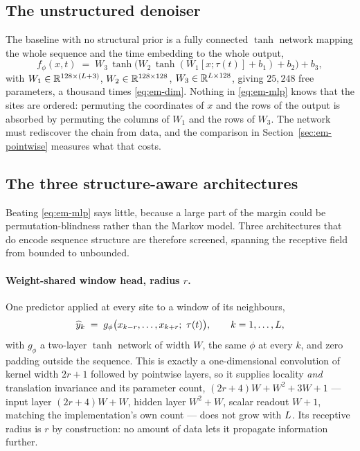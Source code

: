 \subsection{The unstructured denoiser}

The baseline with no structural prior is a fully connected $\tanh$ network
mapping the whole sequence and the time embedding to the whole output,
\begin{equation}
  f_\phi(x,t) \;=\; W_3\,\tanh\!\big(W_2\,\tanh(W_1 [x;\tau(t)] + b_1) + b_2\big) + b_3,
  \label{eq:em-mlp}
\end{equation}
with $W_1 \in \mathbb{R}^{128\times(L+3)}$, $W_2 \in \mathbb{R}^{128\times128}$,
$W_3 \in \mathbb{R}^{L\times128}$, giving $25{,}248$ free parameters, a thousand
times \eqref{eq:em-dim}. Nothing in \eqref{eq:em-mlp} knows that the sites are
ordered: permuting the coordinates of $x$ and the rows of the output is absorbed
by permuting the columns of $W_1$ and the rows of $W_3$. The network must
rediscover the chain from data, and the comparison in
Section~\ref{sec:em-pointwise} measures what that costs.

\subsection{The three structure-aware architectures}\label{sec:em-archs}

Beating \eqref{eq:em-mlp} says little, because a large part of the margin could
be permutation-blindness rather than the Markov model. Three architectures that
do encode sequence structure are therefore screened, spanning the receptive
field from bounded to unbounded.

\paragraph{Weight-shared window head, radius $r$.} One predictor applied at
every site to a window of its neighbours,
\begin{equation}
  \widehat{y}_k \;=\; g_\phi\big(x_{k-r},\dots,x_{k+r};\ \tau(t)\big),
  \qquad k = 1,\dots,L,
  \label{eq:em-window}
\end{equation}
with $g_\phi$ a two-layer $\tanh$ network of width $W$, the same $\phi$ at every
$k$, and zero padding outside the sequence. This is exactly a one-dimensional
convolution of kernel width $2r+1$ followed by pointwise layers, so it supplies
locality \emph{and} translation invariance and its parameter count,
$(2r+4)W + W^2 + 3W + 1$ --- input layer $(2r+4)W + W$, hidden layer
$W^2 + W$, scalar readout $W + 1$, matching the implementation's own count ---
does not grow with $L$. Its receptive radius is
$r$ by construction: no amount of data lets it propagate information further.

